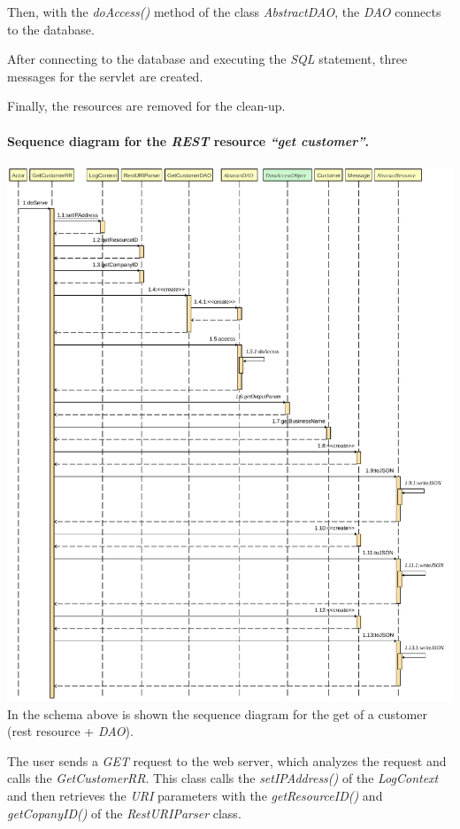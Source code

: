 Then, with the \textit{doAccess()} method of the class \textit{AbstractDAO}, the \textit{DAO} connects to the database.

After connecting to the database and executing the \textit{SQL} statement, three messages for the servlet are created.

Finally, the resources are removed for the clean-up.
\pagebreak
\paragraph[]{Sequence diagram for the \textit{REST} resource \textit{``get customer''}.} \hspace{1mm} \par
\includegraphics[width=\textwidth, keepaspectratio]{resources/getcustomersequence.pdf}
In the schema above is shown the sequence diagram for the get of a customer (rest resource + \textit{DAO}). 

The user sends a \textit{GET} request to the web server, which analyzes the request and calls the \textit{GetCustomerRR}. This class calls the \textit{setIPAddress()} of the \textit{LogContext} and then retrieves the \textit{URI} parameters with the \textit{getResourceID()} and \textit{getCopanyID()} of the \textit{RestURIParser} class.

